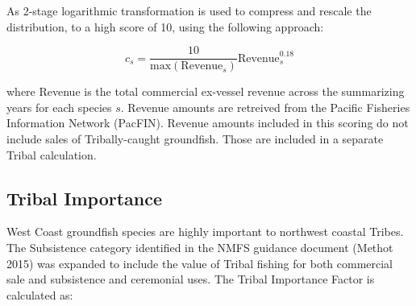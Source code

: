\documentclass[11pt,
  english,
  a4paper,
]{article}
\begin{document}
\leavevmode\tagmcend\tagstructend\par


As 2-stage logarithmic transformation is used to compress and rescale the distribution, to a high score of 10, using the following approach:

\leavevmode\tagmcend\tagstructend\par


\begin{equation}
  c_{s} = \frac{10}{\text{max}(\text{Revenue}_s)}\text{Revenue}_s^{0.18} 
\end{equation}

\leavevmode\tagmcend\tagstructend\par


where Revenue is the total commercial ex-vessel revenue across the summarizing years for each species {\(s\)\leavevmode\tagmcend\tagstructend}. Revenue amounts are retreived from the Pacific Fisheries Information Network (PacFIN). Revenue amounts included in this scoring do not include sales of Tribally-caught groundfish. Those are included in a separate Tribal calculation.

\leavevmode\tagmcend\tagstructend\par


\hypertarget{tribal-importance}{%
\subsection{Tribal Importance}\label{tribal-importance}}

\leavevmode\tagmcend\tagstructend


West Coast groundfish species are highly important to northwest coastal Tribes. The Subsistence category identified in the NMFS guidance document {(Methot 2015)\leavevmode\tagmcend\tagstructend} was expanded to include the value of Tribal fishing for both commercial sale and subsistence and ceremonial uses. The Tribal Importance Factor is calculated as:

\leavevmode\tagmcend\tagstructend\par
\end{document}
